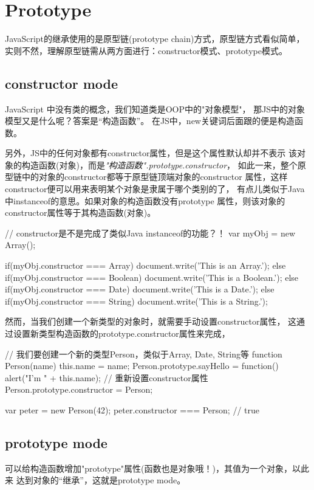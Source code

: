 \section[Prototype]{Prototype}
JavaScript的继承使用的是原型链(prototype chain)方式，原型链方式看似简单，
实则不然，理解原型链需从两方面进行：constructor模式、prototype模式。

\subsection[constructor mode]{constructor mode}
JavaScript 中没有类的概念，我们知道类是OOP中的"对象模型"，
那JS中的对象模型又是什么呢？答案是“构造函数”。
在JS中，new关键词后面跟的便是构造函数。

另外，JS中的任何对象都有constructor属性，但是这个属性默认却并不表示
该对象的构造函数(对象)，而是\emph{"构造函数".prototype.constructor}，
如此一来，整个原型链中的对象的constructor都等于原型链顶端对象的constructor
属性，这样constructor便可以用来表明某个对象是隶属于哪个类别的了，
有点儿类似于Java中instanceof的意思。如果对象的构造函数没有prototype
属性，则该对象的constructor属性等于其构造函数(对象)。

\begin{javascriptcode}
// constructor是不是完成了类似Java instanceof的功能？！
var myObj = new Array();

if(myObj.constructor === Array) {
  document.write('This is an Array.');
} else if(myObj.constructor === Boolean) {
  document.write('This is a Boolean.');
} else if(myObj.constructor === Date) {
  document.write('This is a Date.');
} else if(myObj.constructor === String) {
  document.write('This is a String.');
}
\end{javascriptcode}

然而，当我们创建一个新类型的对象时，就需要手动设置constructor属性，
这通过设置新类型构造函数的prototype.constructor属性来完成，

\begin{javascriptcode}
// 我们要创建一个新的类型Person，类似于Array, Date, String等
function Person(name) {
  this.name = name;
}
Person.prototype.sayHello = function() {
  alert("I'm " + this.name);
}
// 重新设置constructor属性
Person.prototype.constructor = Person;

var peter = new Person(42);
peter.constructor === Person; // true
\end{javascriptcode}

\subsection[prototype mode]{prototype mode}
可以给构造函数增加"prototype"属性(函数也是对象哦！)，其值为一个对象，以此来
达到对象的“继承”，这就是prototype mode。

